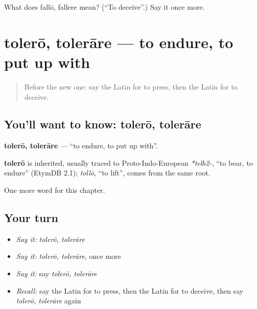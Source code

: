 \begin{tcolorbox}[breakable,colback=teal!4,colframe=teal!35!black,title={Before you move on}]
What does fallō, fallere mean? (\textquotedblleft{}To deceive\textquotedblright{}.) Say it once more.
\end{tcolorbox}
\section[tolerō, tolerāre]{tolerō, tolerāre — to endure, to put up with}

\label{lesson:LA-C171-tolero}



\begin{quote}
Before the new one: say the Latin for to press, then the Latin for to deceive.
\end{quote}

\subsection*{You'll want to know: tolerō, tolerāre}
\textbf{tolerō, tolerāre} — \textquotedblleft{}to endure, to put up with\textquotedblright{}.

\begin{cousinweb}
\textbf{tolerō} is inherited, usually traced to Proto-Indo-European \emph{*telh2-}, \textquotedblleft{}to bear, to endure\textquotedblright{} (EtymDB 2.1); \emph{tollō}, \textquotedblleft{}to lift\textquotedblright{}, comes from the same root.
\end{cousinweb}

\begin{grammarlens}[title={What you've built}]
One more word for this chapter.
\end{grammarlens}

\subsection*{Your turn}
\begin{itemize}
\raggedright
  \item \emph{Say it:} \emph{tolerō, tolerāre}
  \item \emph{Say it:} \emph{tolerō, tolerāre}, once more
  \item \emph{Say it:} say \emph{tolerō, tolerāre}
  \item \emph{Recall:} say the Latin for to press, then the Latin for to deceive, then say \emph{tolerō, tolerāre} again
\end{itemize}


